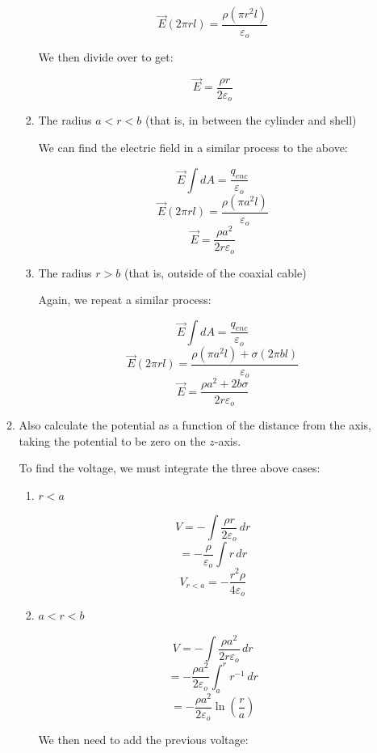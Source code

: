 \begin{enumerate}
\begin{enumerate}
\begin{enumerate}
            $$\vec{E}(2\pi rl)=\frac{\rho(\pi r^2l)}{\varepsilon_o}$$

            We then divide over to get:

            $$\boxed{\vec{E}=\frac{\rho r}{2\varepsilon_o}}$$

          \item The radius $a<r<b$ (that is, in between the cylinder and shell)

            We can find the electric field in a similar process to the above:

            $$\vec{E}\int dA=\frac{q_{enc}}{\varepsilon_o}$$
            $$\vec{E}(2\pi rl)=\frac{\rho(\pi a^2 l)}{\varepsilon_o}$$
            $$\boxed{\vec{E}=\frac{\rho a^2}{2r\varepsilon_o}}$$

          \item The radius $r>b$ (that is, outside of the coaxial cable)

            Again, we repeat a similar process:

            $$\vec{E}\int dA=\frac{q_{enc}}{\varepsilon_o}$$
            $$\vec{E}(2\pi rl)=\frac{\rho(\pi a^2l)+\sigma(2\pi bl)}{\varepsilon_o}$$
            $$\boxed{\vec{E}=\frac{\rho a^2+2b\sigma}{2r\varepsilon_o}}$$

        \end{enumerate}

      \item Also calculate the potential as a function of the distance from the axis, taking the potential to be zero on the $z$-axis.

        To find the voltage, we must integrate the three above cases:

        \begin{enumerate}

          \item $r<a$

            $$V=-\int \frac{\rho r}{2\varepsilon_o}\,dr$$
            $$=-\frac{\rho}{\varepsilon_o}\int r\,dr$$
            $$\boxed{V_{r<a}=-\frac{r^2\rho}{4\varepsilon_o}}$$

          \item $a<r<b$

            $$V=-\int \frac{\rho a^2}{2r\varepsilon_o}\,dr$$
            $$=-\frac{\rho a^2}{2\varepsilon_o}\int_a^r r^{-1}\,dr$$
            $$=-\frac{\rho a^2}{2\varepsilon_o}\ln\left(\frac{r}{a}\right)$$

            We then need to add the previous voltage:


\end{enumerate}
\end{enumerate}
\end{enumerate}
